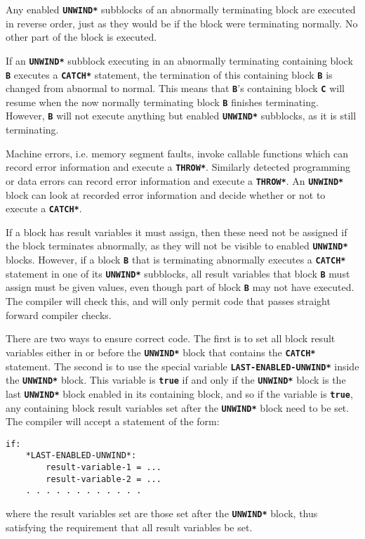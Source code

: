 \documentclass[12pt]{article}
\makeatletter
\newcommand{\TT}[1]{{\tt \bfseries #1}}
\newcommand{\ttkey}[1]{\TT{#1}\index{#1@{\tt #1}}}
\newenvironment{indpar}[1][0.3in]%
	{\begin{list}{}%
		     {\setlength{\itemsep}{0in}%
		      \setlength{\topsep}{0in}%
		      \setlength{\parsep}{1ex}%
		      \setlength{\labelwidth}{#1}%
		      \setlength{\leftmargin}{#1}%
		      \addtolength{\leftmargin}{\labelsep}}%
	 \item}%
	{\end{list}}
\makeatother
\begin{document}
Any enabled \TT{*UNWIND*} subblocks of an abnormally terminating
block are executed in reverse order, just as they would be if
the block were terminating normally.  No other part of the block
is executed.

If an \TT{*UNWIND*} subblock executing in an abnormally terminating
containing block \TT{B}
executes a \TT{*CATCH*} statement, the termination of this
containing block \TT{B}
is changed from abnormal to normal.  This means
that \TT{B}'s containing block \TT{C} will resume when the now
normally terminating block \TT{B} finishes terminating.
However, \TT{B} will not execute anything but enabled \TT{*UNWIND*}
subblocks, as it is still terminating.

Machine errors, i.e. memory segment faults, invoke callable functions
which can record error information and execute a \TT{*THROW*}.
Similarly detected programming or data errors can record
error information and execute a \TT{*THROW*}.  An \TT{*UNWIND*}
block can look at recorded error information and decide whether
or not to execute a \TT{*CATCH*}.

If a block has result variables it must assign, then these need not be
assigned if the block terminates abnormally, as they will not
be visible to enabled \TT{*UNWIND*} blocks.  However, if a block \TT{B}
that is terminating abnormally executes a \TT{*CATCH*} statement in
one of its \TT{*UNWIND*} subblocks,
all result variables that block \TT{B} must assign must be given values, even
though part of block \TT{B} may not have executed.  The compiler
will check this, and will only permit code that passes straight forward
compiler checks.

There are two ways to ensure correct code.  The first is to 
set all block result variables either in or before the
\TT{*UNWIND*} block that contains the \TT{*CATCH*} statement.
The second is to use the special variable
\ttkey{*LAST-ENABLED-UNWIND*} inside the \TT{*UNWIND*} block.
This variable is \TT{true} if and only if the \TT{*UNWIND*}
block is the last \TT{*UNWIND*} block enabled in its containing
block, and so if the variable is \TT{true}, any containing
block result variables set after the \TT{*UNWIND*} block need to be
set.  The compiler will accept a statement of the form:
\begin{indpar}\begin{verbatim}
if:
    *LAST-ENABLED-UNWIND*:
        result-variable-1 = ...
        result-variable-2 = ...
	. . . . . . . . . . . .
\end{verbatim}\end{indpar}
where the result variables set are those set after the \TT{*UNWIND*}
block, thus satisfying the requirement that all result variables be set.
\end{document}
